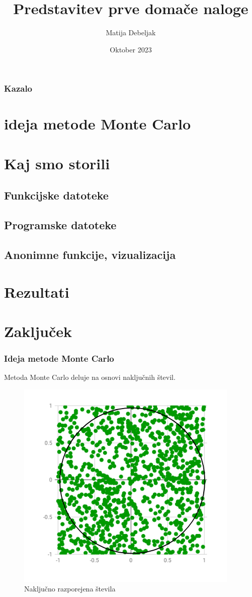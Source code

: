 \documentclass{beamer}
\title{Predstavitev prve domače naloge}
\author{Matija Debeljak}
\institute{Fakulteta za strojništvo}
\date{Oktober 2023}
\begin{document}
\frame{\titlepage}

\begin{frame}
\frametitle{Kazalo}
\section{ideja metode Monte Carlo}
\section{Kaj smo storili}
    \subsection{Funkcijske datoteke}
    \subsection{Programske datoteke}
    \subsection{Anonimne funkcije, vizualizacija}
\section{Rezultati}
\section{Zaključek}
\tableofcontents
\end{frame}

\begin{frame}
\frametitle{Ideja metode Monte Carlo}
\begin{center}
    

Metoda Monte Carlo deluje na osnovi naključnih števil.

\begin{figure}[h]
\includegraphics[scale=0.4]{Slike/MonteCarlo.png}
\caption{Naključno razporejena števila}
\end{figure}
\end{center}
\end{frame}
\end{document}
